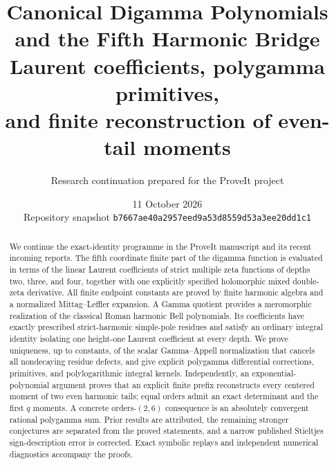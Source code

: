 \documentclass[11pt,a4paper]{article}
\title{\textbf{Canonical Digamma Polynomials\protect\\and the Fifth Harmonic Bridge}\\[5pt]
\large Laurent coefficients, polygamma primitives,\\and finite reconstruction of even-tail moments}
\author{Research continuation prepared for the ProveIt project}
\date{11 October 2026\\\small Repository snapshot \texttt{b7667ae40a2957eed9a53d8559d53a3ee20dd1c1}}
\numberwithin{equation}{section}
\theoremstyle{definition}
\begin{document}
\maketitle
\begin{abstract}
We continue the exact-identity programme in the ProveIt manuscript and
its recent incoming reports. The fifth coordinate finite part of the
digamma function is evaluated in terms of the linear Laurent
coefficients of strict multiple zeta functions of depths two, three,
and four, together with one explicitly specified holomorphic mixed
double-zeta derivative. All finite endpoint constants are proved by
finite harmonic algebra and a normalized Mittag--Leffler expansion.
A Gamma quotient provides a meromorphic realization of the classical
Roman harmonic Bell polynomials. Its coefficients have exactly
prescribed strict-harmonic simple-pole residues and satisfy an ordinary
integral identity isolating one height-one Laurent coefficient at every
depth. We prove uniqueness, up to constants, of the scalar Gamma--Appell
normalization that cancels all nondecaying residue defects, and give
explicit polygamma differential corrections, primitives, and polylogarithmic
integral kernels. Independently, an exponential-polynomial argument proves
that an explicit finite prefix reconstructs every centered moment of
two even harmonic tails; equal orders admit an exact determinant and
the first $q$ moments. A concrete orders-$(2,6)$ consequence is an
absolutely convergent rational polygamma sum. Prior results are attributed,
the remaining stronger conjectures are separated from the proved
statements, and a narrow published Stieltjes sign-description error is
corrected. Exact symbolic replays and independent numerical diagnostics
accompany the proofs.
\end{abstract}
\tableofcontents
\clearpage











\end{document}
